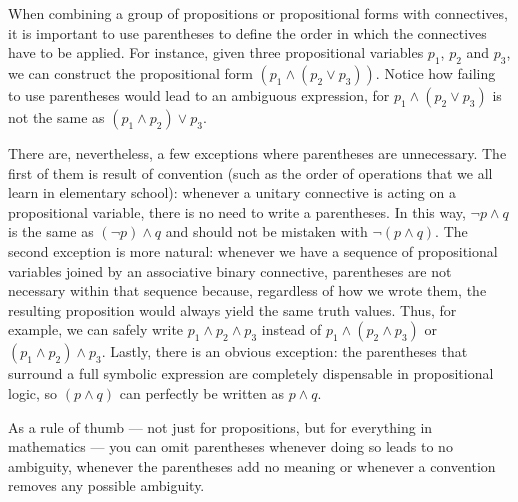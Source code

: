 \begin{para}

\label{hierarchy}
When combining a group of propositions or propositional forms with connectives, it is important to use parentheses to define the order in which the connectives have to be applied.
For instance, given three propositional variables $p_1$, $p_2$ and $p_3$, we can construct the propositional form $(p_1 \land (p_2 \lor p_3))$. Notice how failing to use parentheses would lead to an ambiguous expression, for $p_1 \land (p_2\lor p_3)$ is not the same as $(p_1 \land p_2) \lor p_3$.

There are, nevertheless, a few exceptions where parentheses are unnecessary.
The first of them is result of convention (such as the order of operations that we all learn in elementary school):  whenever a unitary connective is acting on a propositional variable, there is no need to write a parentheses.
In this way, $\lnot p \land q$ is the same as $(\lnot p)\land q$ and should not be mistaken with $\lnot(p\land q)$.
The second exception is more natural: whenever we have a sequence of propositional variables joined by an associative binary connective, parentheses are not necessary within that sequence because, regardless of how we wrote them, the resulting proposition would always yield the same truth values.
Thus, for example, we can safely write $p_1\land p_2 \land p_3$ instead of $p_1\land (p_2 \land p_3)$ or $(p_1\land p_2) \land p_3$.
Lastly, there is an obvious exception: the parentheses that surround a full symbolic expression are completely dispensable in propositional logic, so $(p\land q)$ can perfectly be written as $p\land q$.

As a rule of thumb --- not just for propositions, but for everything in mathematics --- you can omit parentheses whenever doing so leads to no ambiguity, whenever the parentheses add no meaning or whenever a convention removes any possible ambiguity. 

\end{para}

